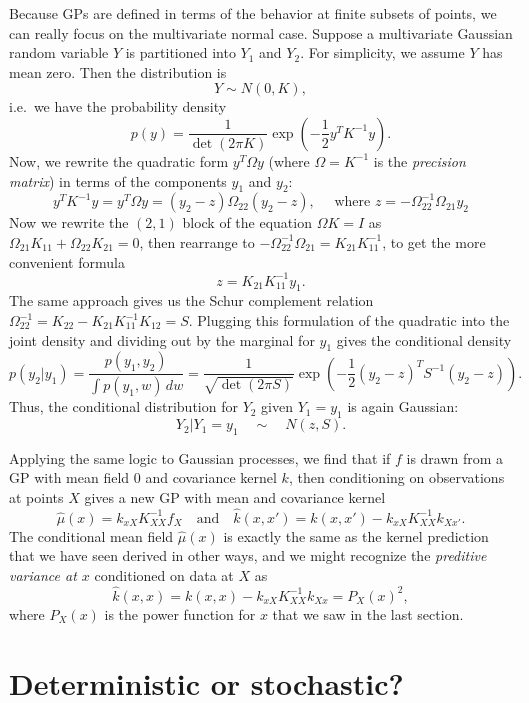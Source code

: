 \documentclass[12pt, leqno]{article} %
\begin{document}
Because GPs are defined in terms of the behavior at finite subsets of
points, we can really focus on the multivariate normal case.
Suppose a multivariate Gaussian random variable $Y$ is
partitioned into $Y_1$ and $Y_2$.  For simplicity, we assume
$Y$ has mean zero.  Then the distribution is
\[
  Y \sim N(0, K),
\]
i.e.~we have the probability density
\[
p(y) = \frac{1}{\det(2\pi K)}
  \exp\left( -\frac{1}{2} y^T K^{-1} y \right).
\]
Now, we rewrite the quadratic form $y^T \Omega y$ (where
$\Omega = K^{-1}$ is the {\em precision matrix})
in terms of the components $y_1$ and $y_2$:
\[
  y^T K^{-1} y
  = y^T \Omega y
  = (y_2 - z) \Omega_{22} (y_2-z), \quad \mbox{ where }
  z = -\Omega_{22}^{-1} \Omega_{21} y_2  
\]
Now we rewrite the $(2,1)$ block of the equation $\Omega K = I$
as $\Omega_{21} K_{11} + \Omega_{22} K_{21} = 0$, then
rearrange to $-\Omega_{22}^{-1} \Omega_{21} = K_{21} K_{11}^{-1}$,
to get the more convenient formula
\[
  z = K_{21} K_{11}^{-1} y_1.
\]
The same approach gives us the Schur complement relation
$\Omega_{22}^{-1} = K_{22}-K_{21} K_{11}^{-1} K_{12} = S$.
Plugging this formulation of the quadratic into the joint density and
dividing out by the marginal for $y_1$ gives the conditional density
\[
p(y_2 | y_1)
  = \frac{p(y_1, y_2)}{\int p(y_1, w) \, dw}
  = \frac{1}{\sqrt{\det(2\pi S)}} \exp\left( -\frac{1}{2} (y_2-z)^T S^{-1} (y_2-z) \right).
\]
Thus, the conditional distribution for $Y_2$ given $Y_1 = y_1$ is
again Gaussian:
\[
  Y_2 | Y_1 = y_1 \quad \sim \quad
  N(z, S).
  \]
  
Applying the same logic to Gaussian processes, we find that if
$f$ is drawn from a GP with mean field $0$ and covariance kernel $k$,
then conditioning on observations at points $X$ gives a new GP
with mean and covariance kernel
\[
  \hat{\mu}(x) = k_{xX} K_{XX}^{-1} f_X
  \quad \mbox{and} \quad
  \hat{k}(x,x') = k(x,x') - k_{xX} K_{XX}^{-1} k_{Xx'}.
\]
The conditional mean field $\hat{\mu}(x)$ is exactly the same as
the kernel prediction that we have seen derived in other ways,
and we might recognize the {\em preditive variance at $x$}
conditioned on data at $X$ as
\[
  \hat{k}(x,x) = k(x,x) - k_{xX} K_{XX}^{-1} k_{Xx} = P_X(x)^2,
\]
where $P_X(x)$ is the power function for $x$ that we saw
in the last section.

\section{Deterministic or stochastic?}
\end{document}
